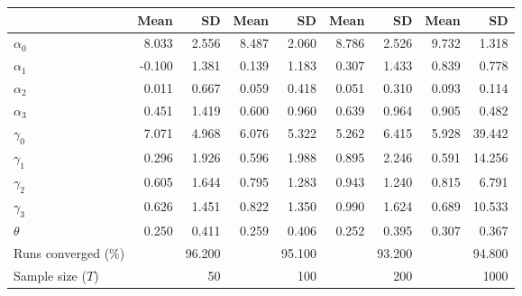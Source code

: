 
\begin{tabular}[t]{lrrrrrrrr}
\toprule
  & Mean & SD & Mean  & SD  & Mean   & SD   & Mean    & SD   \\
\midrule
$\alpha_{0}$ & 8.033 & 2.556 & 8.487 & 2.060 & 8.786 & 2.526 & 9.732 & 1.318\\
$\alpha_{1}$ & -0.100 & 1.381 & 0.139 & 1.183 & 0.307 & 1.433 & 0.839 & 0.778\\
$\alpha_{2}$ & 0.011 & 0.667 & 0.059 & 0.418 & 0.051 & 0.310 & 0.093 & 0.114\\
$\alpha_{3}$ & 0.451 & 1.419 & 0.600 & 0.960 & 0.639 & 0.964 & 0.905 & 0.482\\
$\gamma_{0}$ & 7.071 & 4.968 & 6.076 & 5.322 & 5.262 & 6.415 & 5.928 & 39.442\\
$\gamma_{1}$ & 0.296 & 1.926 & 0.596 & 1.988 & 0.895 & 2.246 & 0.591 & 14.256\\
$\gamma_{2}$ & 0.605 & 1.644 & 0.795 & 1.283 & 0.943 & 1.240 & 0.815 & 6.791\\
$\gamma_{3}$ & 0.626 & 1.451 & 0.822 & 1.350 & 0.990 & 1.624 & 0.689 & 10.533\\
$\theta$ & 0.250 & 0.411 & 0.259 & 0.406 & 0.252 & 0.395 & 0.307 & 0.367\\
Runs converged (\%) &  & 96.200 &  & 95.100 &  & 93.200 &  & 94.800\\
Sample size ($T$) &  & 50 &  & 100 &  & 200 &  & 1000\\
\bottomrule
\end{tabular}
